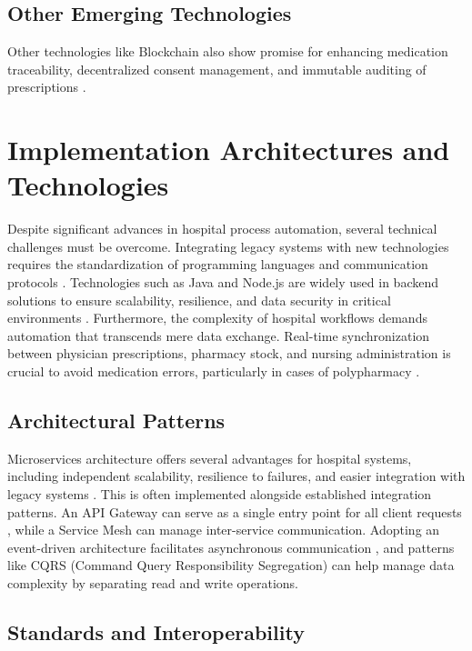 \subsection{Other Emerging Technologies}

Other technologies like Blockchain also show promise for enhancing medication traceability, decentralized consent management, and immutable auditing of prescriptions \cite{franzoso2014}.

\section{Implementation Architectures and Technologies}

Despite significant advances in hospital process automation, several technical challenges must be overcome. Integrating legacy systems with new technologies requires the standardization of programming languages and communication protocols \cite{stanojevic2023conceptualizing}. Technologies such as Java and Node.js are widely used in backend solutions to ensure scalability, resilience, and data security in critical environments \cite{nkenyereye2016}. Furthermore, the complexity of hospital workflows demands automation that transcends mere data exchange. Real-time synchronization between physician prescriptions, pharmacy stock, and nursing administration is crucial to avoid medication errors, particularly in cases of polypharmacy \citep{Tukukino2022, falconer2021pharmacist}.

\subsection{Architectural Patterns}

Microservices architecture offers several advantages for hospital systems, including independent scalability, resilience to failures, and easier integration with legacy systems \cite{shermock2023, vaghasiya2023, newman2021}. This is often implemented alongside established integration patterns. An API Gateway can serve as a single entry point for all client requests \cite{newman2021}, while a Service Mesh can manage inter-service communication. Adopting an event-driven architecture facilitates asynchronous communication \cite{fowler2018}, and patterns like CQRS (Command Query Responsibility Segregation) can help manage data complexity by separating read and write operations.

\subsection{Standards and Interoperability}

